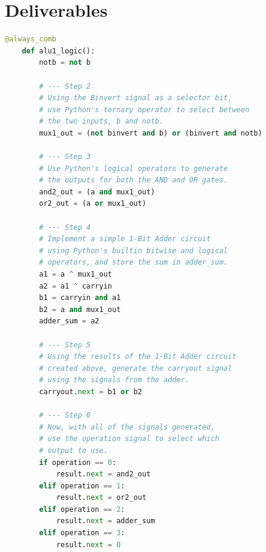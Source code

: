 \documentclass{article}
\begin{document}
\section{Deliverables}
    \begin{lstlisting}[language=Python,frame=tb]
    @always_comb 
    def alu1_logic():
        notb = not b

        # --- Step 2
        # Using the Binvert signal as a selector bit,
        # use Python's ternary operator to select between
        # the two inputs, b and notb.
        mux1_out = (not binvert and b) or (binvert and notb)

        # --- Step 3
        # Use Python's logical operators to generate
        # the outputs for both the AND and OR gates.
        and2_out = (a and mux1_out)
        or2_out = (a or mux1_out)
        
        # --- Step 4
        # Implement a simple 1-Bit Adder circuit
        # using Python's builtin bitwise and logical
        # operators, and store the sum in adder_sum.
        a1 = a ^ mux1_out
        a2 = a1 ^ carryin
        b1 = carryin and a1
        b2 = a and mux1_out
        adder_sum = a2
        
        # --- Step 5
        # Using the results of the 1-Bit Adder circuit
        # created above, generate the carryout signal
        # using the signals from the adder.
        carryout.next = b1 or b2

        # --- Step 6
        # Now, with all of the signals generated,
        # use the operation signal to select which
        # output to use.
        if operation == 0:
            result.next = and2_out
        elif operation == 1:
            result.next = or2_out
        elif operation == 2:
            result.next = adder_sum
        elif operation == 3:
            result.next = 0
    \end{lstlisting}

\break
\end{document}
